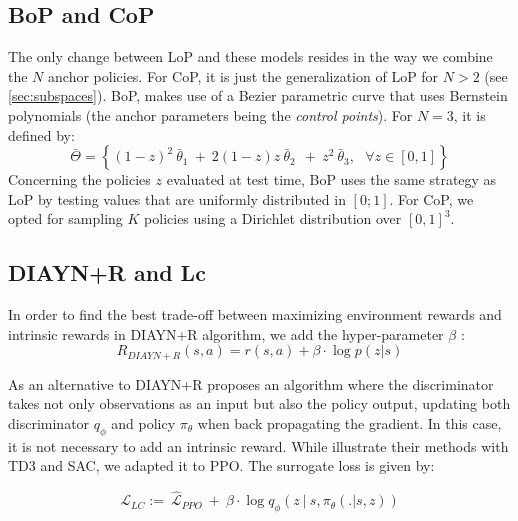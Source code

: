 \subsection{BoP and CoP}
\label{subsec:bopcop}

The only change between LoP and these models resides in the way we combine the $N$ anchor policies. For CoP, it is just the generalization of LoP for $N>2$ (see \ref{sec:subspaces}).  BoP, makes use of a Bezier parametric curve that uses Bernstein polynomials (the anchor parameters being the \textit{control points}). For $N=3$, it is defined by:
\begin{equation}
\bar\Theta=\left \{(1-z)^2\:\bar\theta_1\:+\:2\left ( 1-z \right )z\:\bar\theta_2 \:\: + \: z^2\:\bar\theta_3,\:\:\: \forall z\in[0,1]\right\}
\end{equation}
 Concerning the policies $z$ evaluated at test time,  BoP uses the same strategy as LoP by testing values that are uniformly distributed in $[0;1]$. For CoP, we opted for sampling $K$ policies using a Dirichlet distribution over $[0,1]^3$.
 
\subsection{DIAYN+R and Lc}
\label{subsec:diayn_lc}
In order to find the best trade-off between maximizing environment rewards and intrinsic rewards in DIAYN+R algorithm, we add the hyper-parameter $\beta$ :
\begin{equation}
    R_{DIAYN+R}(s,a) = r(s,a) + \beta \cdot \log p(z|s)
\end{equation}

As an alternative to DIAYN+R \cite{Tokyo} proposes an algorithm where the discriminator takes not only observations as an input but also the policy output, updating both discriminator $q_\phi$ and policy $\pi_\theta$ when back propagating the gradient. In this case, it is not necessary to add an intrinsic reward. While \cite{Tokyo} illustrate their methods with TD3 and SAC, we adapted it to PPO. The surrogate loss is given by:

\begin{equation}
\mathcal{L}_{LC}:=\:\widehat{\mathcal{L}}_{PPO}\:+\:\beta\cdot\log q_{\phi}\left ( z \:|\:s,\pi_{\theta}\left ( .|s,z \right ) \right )
\end{equation}




